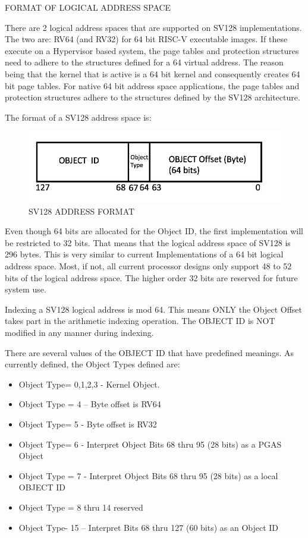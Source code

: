 \documentclass{article}
\begin{document}
FORMAT OF LOGICAL ADDRESS SPACE

There are 2   logical address spaces that are supported on SV128 implementations.  The two are: RV64 (and RV32) for 64 bit RISC-V executable images. If these execute on a Hypervisor based system,  the page tables and protection structures need to adhere to the  structures defined for a 64 virtual address. The reason being that the kernel that is active is a 64 bit kernel and consequently creates 64  bit page tables. For native 64 bit address space applications,  the page tables and protection structures adhere to the structures defined by the SV128 architecture.



The format of a SV128 address space is:



\begin{figure}[h]
\begin{center}
\includegraphics[scale = .4]
{figures/figure1b_objectid_image.jpg}
\caption{SV128 ADDRESS FORMAT}
\end{center}
\end{figure}


Even though 64 bits are allocated for the Object ID,  the first implementation will be restricted to 32 bits.  That  means that the logical address space of SV128 is 296  bytes.  This is  very similar to current Implementations of a 64 bit logical address space.  Most, if not, all current processor designs  only support 48 to 52 bits of the logical address space. The higher order 32 bits are reserved for future system use.

Indexing a SV128 logical address is mod 64.  This means ONLY the Object Offset takes part in the arithmetic indexing operation.  The OBJECT ID is NOT modified in any manner during indexing.

There are several values of the OBJECT ID that have predefined meanings.  As currently defined,  the Object Types defined are: 


\begin{itemize}
\item Object  Type= 0,1,2,3 -  Kernel Object.
\item   Object  Type = 4 – Byte offset is RV64
\item   Object  Type=  5 -  Byte offset is RV32
\item   Object   Type= 6 -   Interpret Object Bits 68 thru 95 (28 bits) as a PGAS Object
\item   Object Type = 7 -    Interpret Object Bits 68 thru 95 (28 bits) as a local OBJECT ID
\item   Object  Type = 8 thru 14 reserved
\item  Object  Type- 15 – Interpret Bits 68 thru 127 (60 bits) as an Object ID

\end{itemize}
\end{document}
